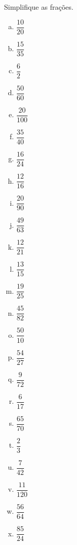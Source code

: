 \item Simplifique as frações.
\begin{multicols}{6}
\begin{enumerate}[a)]
	\item $\dfrac{10}{20}$
	\item $\dfrac{15}{35}$
	\item $\dfrac{6}{2}$
	\item $\dfrac{50}{60}$
	\item $\dfrac{20}{100}$
	\item $\dfrac{35}{40}$
	\item $\dfrac{16}{24}$
	\item $\dfrac{12}{16}$
	\item $\dfrac{20}{90}$
	\item $\dfrac{49}{63}$
	\item $\dfrac{12}{21}$
	\item $\dfrac{13}{15}$
	\item $\dfrac{19}{25}$
	\item $\dfrac{45}{82}$
	\item $\dfrac{50}{10}$
	\item $\dfrac{54}{27}$
	\item $\dfrac{9}{72}$
	\item $\dfrac{6}{17}$
	\item $\dfrac{65}{70}$
	\item $\dfrac{2}{3}$
	\item $\dfrac{7}{42}$
	\item $\dfrac{11}{120}$
	\item $\dfrac{56}{64}$
	\item $\dfrac{85}{24}$			
\end{enumerate}
\end{multicols}

